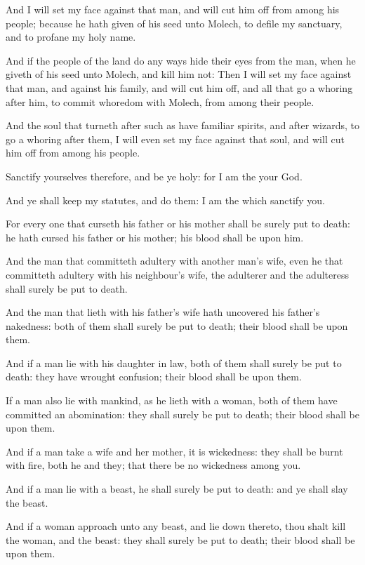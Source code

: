 \verse And I will set my face against that man, and will cut him off from among his people; because he hath given of his seed unto Molech, to defile my sanctuary, and to profane my holy name.

\verse And if the people of the land do any ways hide their eyes from the man, when he giveth of his seed unto Molech, and kill him not: \verse Then I will set my face against that man, and against his family, and will cut him off, and all that go a whoring after him, to commit whoredom with Molech, from among their people.

\verse And the soul that turneth after such as have familiar spirits, and after wizards, to go a whoring after them, I will even set my face against that soul, and will cut him off from among his people.

\verse Sanctify yourselves therefore, and be ye holy: for I am the \LORD your God.

\verse And ye shall keep my statutes, and do them: I am the \LORD which sanctify you.

\verse For every one that curseth his father or his mother shall be surely put to death: he hath cursed his father or his mother; his blood shall be upon him.

\verse And the man that committeth adultery with another man's wife, even he that committeth adultery with his neighbour's wife, the adulterer and the adulteress shall surely be put to death.

\verse And the man that lieth with his father's wife hath uncovered his father's nakedness: both of them shall surely be put to death; their blood shall be upon them.

\verse And if a man lie with his daughter in law, both of them shall surely be put to death: they have wrought confusion; their blood shall be upon them.

\verse If a man also lie with mankind, as he lieth with a woman, both of them have committed an abomination: they shall surely be put to death; their blood shall be upon them.

\verse And if a man take a wife and her mother, it is wickedness: they shall be burnt with fire, both he and they; that there be no wickedness among you.

\verse And if a man lie with a beast, he shall surely be put to death: and ye shall slay the beast.

\verse And if a woman approach unto any beast, and lie down thereto, thou shalt kill the woman, and the beast: they shall surely be put to death; their blood shall be upon them.

